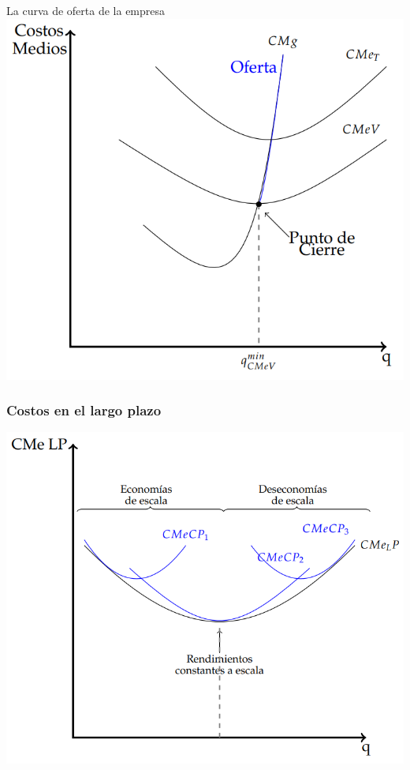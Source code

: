 \documentclass{beamer}
\begin{document}
\begin{frame}{La curva de oferta de la empresa}
    \centering
    \includegraphics[scale=0.5]{../Figures/C13.11.png}
\end{frame}

\begin{frame}
    \frametitle{Costos en el largo plazo}
    \centering
    \includegraphics[scale=0.6]{../Figures/C13.10.png}
\end{frame}
\end{document}
